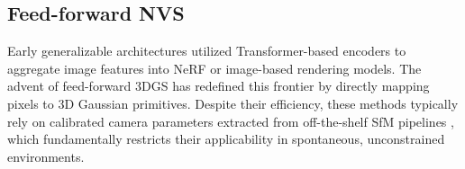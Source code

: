 

\subsection{Feed-forward NVS}
Early generalizable architectures \cite{pixelnerf, mvsnerf, ibrnet, gpnr} utilized Transformer-based encoders to aggregate image features into NeRF \cite{mildenhall2020nerf} or image-based rendering models. The advent of feed-forward 3DGS \cite{charatan2024pixelsplat, szymanowicz2024splatter, chen2024mvsplat, xu2025depthsplat, ziwen2025long, wang2025zpressor} has redefined this frontier by directly mapping pixels to 3D Gaussian primitives. Despite their efficiency, these methods typically rely on calibrated camera parameters extracted from off-the-shelf SfM pipelines \cite{schonberger2016structure, DBLP:journals/tog/SnavelySS06}, which fundamentally restricts their applicability in spontaneous, unconstrained environments. 

